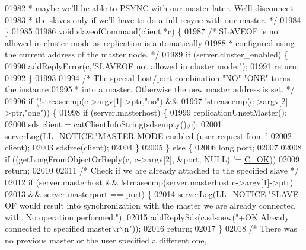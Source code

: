 \begin{DoxyCode}
{{{{{{{{{{{{{{{{{{{{{{{{{{{{{{{{{{{{{{{{{{{{{{{{{{{{{{{{{{{{{{{{{{{{{{{01982 \textcolor{comment}{     * maybe we'll be able to PSYNC with our master later. We'll disconnect}
01983 \textcolor{comment}{     * the slaves only if we'll have to do a full resync with our master. */}
01984 \}
01985 
01986 \textcolor{keywordtype}{void} slaveofCommand(client *c) \{
01987     \textcolor{comment}{/* SLAVEOF is not allowed in cluster mode as replication is automatically}
01988 \textcolor{comment}{     * configured using the current address of the master node. */}
01989     \textcolor{keywordflow}{if} (server.cluster\_enabled) \{
01990         addReplyError(c,\textcolor{stringliteral}{"SLAVEOF not allowed in cluster mode."});
01991         \textcolor{keywordflow}{return};
01992     \}
01993 
01994     \textcolor{comment}{/* The special host/port combination "NO" "ONE" turns the instance}
01995 \textcolor{comment}{     * into a master. Otherwise the new master address is set. */}
01996     \textcolor{keywordflow}{if} (!strcasecmp(c->argv[1]->ptr,\textcolor{stringliteral}{"no"}) &&
01997         !strcasecmp(c->argv[2]->ptr,\textcolor{stringliteral}{"one"})) \{
01998         \textcolor{keywordflow}{if} (server.masterhost) \{
01999             replicationUnsetMaster();
02000             sds client = catClientInfoString(sdsempty(),c);
02001             serverLog(\hyperlink{server_8h_a8c54c191e436c7dd3012167212692401}{LL\_NOTICE},\textcolor{stringliteral}{"MASTER MODE enabled (user request from '%
02002                 client);
02003             sdsfree(client);
02004         \}
02005     \} \textcolor{keywordflow}{else} \{
02006         \textcolor{keywordtype}{long} port;
02007 
02008         \textcolor{keywordflow}{if} ((getLongFromObjectOrReply(c, c->argv[2], &port, NULL) != \hyperlink{server_8h_a303769ef1065076e68731584e758d3e1}{C\_OK}))
02009             \textcolor{keywordflow}{return};
02010 
02011         \textcolor{comment}{/* Check if we are already attached to the specified slave */}
02012         \textcolor{keywordflow}{if} (server.masterhost && !strcasecmp(server.masterhost,c->argv[1]->ptr)
02013             && server.masterport == port) \{
02014             serverLog(\hyperlink{server_8h_a8c54c191e436c7dd3012167212692401}{LL\_NOTICE},\textcolor{stringliteral}{"SLAVE OF would result into synchronization with the master
       we are already connected with. No operation performed."});
02015             addReplySds(c,sdsnew(\textcolor{stringliteral}{"+OK Already connected to specified master\(\backslash\)r\(\backslash\)n"}));
02016             \textcolor{keywordflow}{return};
02017         \}
02018         \textcolor{comment}{/* There was no previous master or the user specified a different one,}
}}}}}}}}}}}}}}}}}}}}}}}}}}}}}}}}}}}}}}}}}}}}}}}}}}}}}}}}}}}}}}}}}}}}}}}}
\end{DoxyCode}
